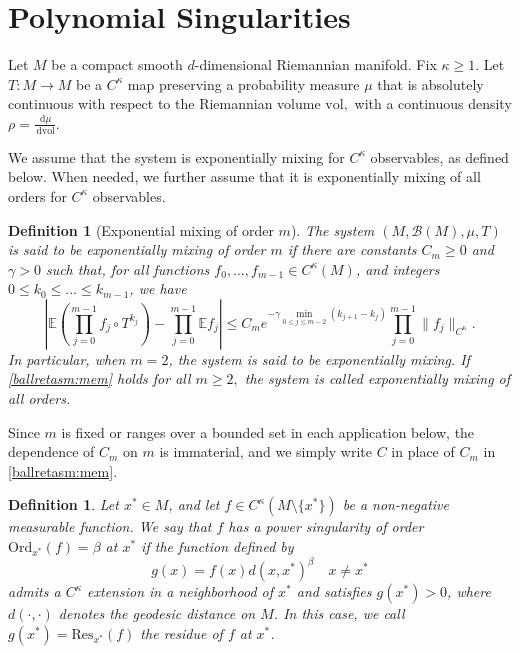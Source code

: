 \documentclass[11pt,twoside,a4paper,reqno]{amsart}
\newtheorem{definition}[theorem]{Definition}
\renewcommand{\d}{\, \text{d}}
\newcommand{\E}{\mathbb{E}}
\begin{document}
\section{Polynomial Singularities}\label{PS}
Let $M$ be a compact smooth $d$-dimensional Riemannian manifold. Fix $\kappa\geq 1$. Let $T:M\to M$ be a $C^{\kappa}$ map preserving a probability measure $\mu$ that is absolutely continuous with respect to the Riemannian volume $\mathrm{vol},$ with a continuous density $\rho = \frac{\d\mu}{\d\mathrm{vol}}.$


We assume that the system is exponentially mixing for $C^\kappa$ observables, as defined below. When needed, we further assume that it is exponentially mixing of all orders for $C^\kappa$ observables.



\begin{definition}[Exponential mixing of order $m$]
The system $(M,\mathcal{B}(M),\mu,T)$ is said to be exponentially mixing of order $m$ if there are constants $C_m\geq 0$ and $\gamma>0$ such that, for all functions $f_0, \dots, f_{m-1} \in C^{\kappa}(M)$, and integers $0 \leq k_0 \leq \dots \leq k_{m-1}$, we have
\begin{equation}\label{ballretasm:mem}
\left|\E\left(\prod_{j=0}^{m-1} f_j \circ T^{k_j}\right)-\prod_{j=0}^{m-1} \E f_j \right|
\leq C_m e^{-\gamma \min_{0\leq j\leq m-2}(k_{j+1}-k_j)}\prod_{j=0}^{m-1} \|f_j\|_{C^{\kappa}}.
\end{equation}
In particular, when $m = 2$, the system is said to be exponentially mixing. If \eqref{ballretasm:mem} holds for all $m \geq 2,$ the system is called exponentially mixing of all orders.
\end{definition}

Since $m$ is fixed  or ranges over a bounded set in each application below, the dependence of $C_m$ on $m$ is immaterial, and we simply write $C$ in place of $C_m$ in \eqref{ballretasm:mem}.





\begin{definition}\label{PowSing}
Let $x^* \in M$, and let $f\in C^{\kappa}(M\setminus \{x^*\})$ be a non-negative measurable function. We say that $f$ has a \textit{power singularity of order} $\mathrm{Ord}_{x^*}(f)=\beta$ at $x^*$ if the function defined by
\begin{equation*}
g(x)=f(x) d(x,x^*)^{\beta} \quad x\not = x^*
\end{equation*}
admits a $C^{\kappa}$ extension in a neighborhood of $x^*$ and satisfies $g(x^*)>0$, where $d(\cdot, \cdot)$ denotes the geodesic distance on $M$. In this case, we call $g(x^*) = \mathrm{Res}_{x^*}(f)$ the residue of $f$ at $x^*$.
\end{definition}
\end{document}
